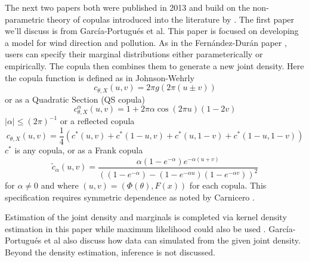 


The next two papers both were published in 2013 and build on the non-parametric theory of copulas introduced into the literature by \cite{fernandez-duran_models_2007}. The first paper we'll discuss is from Garc\'{i}a-Portugu\'{e}s et al. This paper is focused on developing a model for wind direction and pollution. As in the Fern\'{a}ndez-Dur\'{a}n paper \cite{fernandez-duran_models_2007}, users can specify their marginal distributions either parameterically or empirically. The copula then combines them to generate a new joint density. Here the copula function is defined as in Johnson-Wehrly \cite{johnson_angular-linear_1978} \[c_{\theta, X}(u,v) = 2\pi g(2\pi(u\pm v))\] or as a Quadratic Section (QS copula) \[c_{\theta, X}^\alpha (u,v) = 1 + 2\pi \alpha \cos(2\pi u) (1 - 2v)\] $|\alpha| \leq (2\pi)^{-1}$ or a reflected copula \[c_{\theta, X} (u,v) = \frac{1}{4}(c^*(u,v) + c^*(1-u,v) + c^*(u,1-v) + c^*(1-u,1-v))\] $c^*$ is any copula, or as a Frank copula \[\tilde{c}_\alpha(u,v) = \frac{\alpha (1 - e^{-\alpha}) e^{-\alpha(u+v)}}{((1 - e^{-\alpha}) - (1 - e^{-\alpha u})(1 - e^{-\alpha v}))^2}\] for $\alpha \neq 0$ and where $(u, v) = (\Phi(\theta), F(x))$ for each copula. This specification requires symmetric dependence as noted by Carnicero \cite{carnicero_non-parametric_2013}. 

Estimation of the joint density and marginals is completed via kernel density estimation in this paper while maximum likelihood could also be used \cite{garcia-portugues_exploring_2013}. Garc\'{i}a-Portugu\'{e}s et al also discuss how data can simulated from the given joint density. Beyond the density estimation, inference is not discussed.


